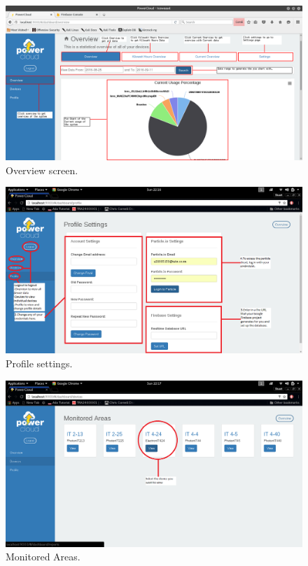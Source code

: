 \documentclass[a4paper,10pt]{article}
\begin{document}
	\begin{figure}[H]
		\includegraphics[width=\textwidth]{images/Overview.png}
		\caption{Overview screen. \label{overflow}}
	\end{figure}
	
	\begin{figure}[H]
		\includegraphics[width=\textwidth]{images/profile.png}
		\caption{Profile settings. \label{overflow}}
	\end{figure}
	
	\begin{figure}[H]
		\includegraphics[width=\textwidth]{images/view.png}
		\caption{Monitored Areas. \label{overflow}}
	\end{figure}
	
\end{document}
